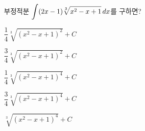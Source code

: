 부정적분 $\displaystyle\int(2x-1)\sqrt[3]{x^2-x+1}\mkern3mu dx$를 구하면? 
\begin{choicesii}{\rule[-3ex]{0pt}{8ex}$\dfrac{1}{4}\sqrt[3]{(x^2-x+1)^2}+C$}{\rule[-3ex]{0pt}{8ex}$\dfrac{3}{4}\sqrt[3]{(x^2-x+1)^2}+C$}{\rule[-3ex]{0pt}{8ex}$\dfrac{1}{4}\sqrt[3]{(x^2-x+1)^4}+C$}{\rule[-3ex]{0pt}{8ex}$\dfrac{3}{4}\sqrt[3]{(x^2-x+1)^4}+C$}{\rule[-3ex]{0pt}{8ex}$\sqrt[3]{(x^2-x+1)^4}+C$}\end{choicesii}
